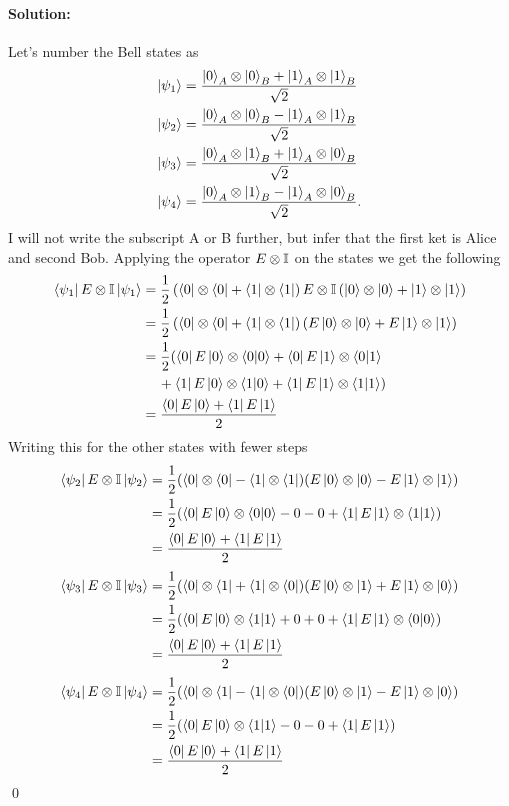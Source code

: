 \paragraph{Solution:} Let's number the Bell states as 
\begin{align}
    \ket{\psi_1} &= \frac{\ket{0}_A \otimes \ket{0}_B + \ket{1}_A \otimes \ket{1}_B}{\sqrt{2}}\\
    \ket{\psi_2} &= \frac{\ket{0}_A \otimes \ket{0}_B - \ket{1}_A \otimes \ket{1}_B}{\sqrt{2}}\\
    \ket{\psi_3} &= \frac{\ket{0}_A \otimes \ket{1}_B + \ket{1}_A \otimes \ket{0}_B}{\sqrt{2}}\\
    \ket{\psi_4} &= \frac{\ket{0}_A \otimes \ket{1}_B - \ket{1}_A \otimes \ket{0}_B}{\sqrt{2}}.
\end{align}
I will not write the subscript A or B further, but infer that the first ket is Alice and second Bob. Applying the operator $E \otimes \mathbb{I}$ on the states we get the following
\begin{align}
    \bra{\psi_1} E \otimes \mathbb{I} \ket{\psi_1} &= \frac{1}{2} \left( \bra{0} \otimes \bra{0} + \bra{1} \otimes \bra{1} \right) E \otimes \mathbb{I} \left( \ket{0} \otimes \ket{0} + \ket{1} \otimes \ket{1}\right)\\
    &= \frac{1}{2} \left( \bra{0} \otimes \bra{0} + \bra{1} \otimes \bra{1} \right) \left( E\ket{0} \otimes \ket{0} + E \ket{1} \otimes \ket{1} \right)\\
    &= \frac{1}{2} ( \bra{0} E \ket{0} \otimes \bra{0}\ket{0} + \bra{0} E \ket{1} \otimes \bra{0}\ket{1}\\
    &\mspace{21mu} + \bra{1} E \ket{0} \otimes \bra{1}\ket{0} + \bra{1} E \ket{1} \otimes \bra{1} \ket{1} )\\
    &= \frac{\bra{0} E \ket{0} + \bra{1} E \ket{1}}{2}
\end{align}
Writing this for the other states with fewer steps
\begin{align}
    \bra{\psi_2} E \otimes \mathbb{I} \ket{\psi_2} &= \frac{1}{2}(\bra{0} \otimes \bra{0} - \bra{1} \otimes \bra{1}) (E \ket{0} \otimes \ket{0} - E \ket{1} \otimes \ket{1})\\
    &= \frac{1}{2}(\bra{0} E \ket{0} \otimes \bra{0}\ket{0} - 0 - 0  + \bra{1} E \ket{1} \otimes \bra{1} \ket{1})\\
    &= \frac{\bra{0} E \ket{0} + \bra{1} E \ket{1}}{2}
\end{align}
\begin{align}
    \bra{\psi_3} E \otimes \mathbb{I} \ket{\psi_3} &= \frac{1}{2} (\bra{0} \otimes \bra{1} + \bra{1} \otimes \bra{0}) (E \ket{0} \otimes \ket{1} + E \ket{1} \otimes \ket{0})\\
    &= \frac{1}{2} (\bra{0} E \ket{0} \otimes \bra{1}\ket{1} + 0 + 0 + \bra{1} E \ket{1} \otimes \bra{0}\ket{0}) \\
    &= \frac{\bra{0} E \ket{0} + \bra{1} E \ket{1}}{2}
\end{align}
\begin{align}
    \bra{\psi_4} E \otimes \mathbb{I} \ket{\psi_4} &= \frac{1}{2} ( \bra{0} \otimes \bra{1} - \bra{1} \otimes \bra{0} ) (E \ket{0} \otimes \ket{1} - E \ket{1} \otimes \ket{0})\\
    &= \frac{1}{2} ( \bra{0} E \ket{0} \otimes \bra{1}\ket{1} - 0 - 0 + \bra{1}E \ket{1} )\\
    &=\frac{\bra{0} E \ket{0} + \bra{1} E \ket{1}}{2}
\end{align}
\qed